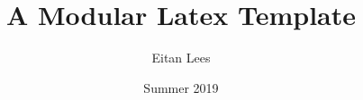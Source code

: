 \documentclass[12pt]{article}
\title{A Modular Latex Template}
\author{Eitan Lees}
\date{Summer 2019}
\begin{document}
    \tableofcontents

	\newpage
    
    
    
    
    

	\newpage
	

	\newpage
	\nocite{*}
	
	
\end{document}
